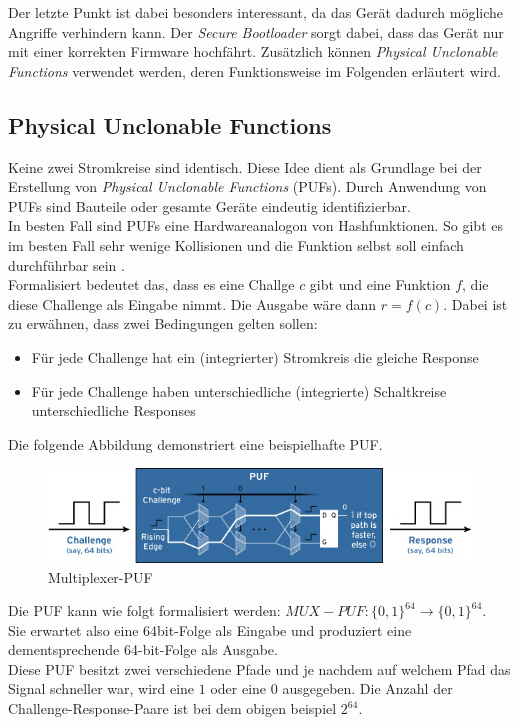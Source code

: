 \documentclass[conference]{IEEEtran}
\begin{document}
Der letzte Punkt ist dabei besonders interessant, da das Gerät dadurch mögliche Angriffe verhindern kann. Der \textit{Secure Bootloader} sorgt dabei, dass das Gerät nur mit einer korrekten Firmware hochfährt. Zusätzlich können \textit{Physical Unclonable Functions} verwendet werden, deren Funktionsweise im Folgenden erläutert wird.

\subsection{Physical Unclonable Functions}
Keine zwei Stromkreise sind identisch. Diese Idee dient als Grundlage bei der Erstellung von \textit{Physical Unclonable Functions} (PUFs). Durch Anwendung von PUFs sind Bauteile oder gesamte Geräte eindeutig identifizierbar.\\
In besten Fall sind PUFs eine Hardwareanalogon von Hashfunktionen. So gibt es im besten Fall sehr wenige Kollisionen und die Funktion selbst soll einfach durchführbar sein \cite{pufs2015}.\\
Formalisiert bedeutet das, dass es eine Challge $c$ gibt und eine Funktion $f$, die diese Challenge als Eingabe nimmt. Die Ausgabe wäre dann $r = f(c)$. 
Dabei ist zu erwähnen, dass zwei Bedingungen gelten sollen:
\begin{itemize}
  \item Für jede Challenge hat ein (integrierter) Stromkreis die gleiche Response
  \item Für jede Challenge haben unterschiedliche (integrierte) Schaltkreise unterschiedliche Responses 
\end{itemize}

Die folgende Abbildung demonstriert eine beispielhafte PUF. 

\begin{figure}[h]
\centering
  \includegraphics[width=\columnwidth]{puf}
  \caption{Multiplexer-PUF}
  \label{fig:puf}
\end{figure}

Die PUF kann wie folgt formalisiert werden: $MUX-PUF: \{0,1\}^{64} \rightarrow \{0,1\}^{64}$. \\
Sie erwartet also eine 64bit-Folge als Eingabe und produziert eine dementsprechende 64-bit-Folge als Ausgabe.\\
Diese PUF besitzt zwei verschiedene Pfade und je nachdem auf welchem Pfad das Signal schneller war, wird eine $1$ oder eine $0$ ausgegeben. Die Anzahl der Challenge-Response-Paare ist bei dem obigen beispiel $2^{64}$\cite{webpufs}.\\
\end{document}
